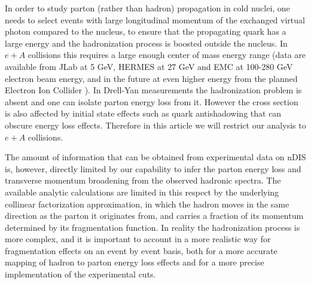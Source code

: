 In order to study parton (rather than hadron) propagation in cold nuclei, one needs to select events with large longitudinal momentum of the exchanged virtual photon compared to the nucleus, to ensure that the propagating quark has a large energy and the hadronization process is boosted outside the nucleus. In $e+A$ collisions this requires a large enough center of mass energy range  (data are available from JLab at 5 GeV, HERMES at 27 GeV and EMC at 100-280 GeV electron beam energy, and in the future at even higher energy from the planned Electron Ion Collider \cite{Accardi:2009qv}). In Drell-Yan measurements the hadronization problem is absent and one can isolate parton energy loss from it. However the cross section is also affected by initial state effects such as quark antishadowing that can obscure energy loss effects. Therefore in this article we will restrict our analysis to $e+A$ collisions.

The amount of information that can be obtained from experimental data on nDIS is, however, directly limited by our capability to infer the parton energy loss and transverse momentum broadening from the observed hadronic spectra. The available analytic calculations \cite{Accardi:2009qv} are limited in this respect by the underlying collinear factorization approximation, in which 
the hadron moves in the same direction as the parton it originates from, and carries a fraction of its momentum determined by its fragmentation function. In reality the hadronization process is more complex, and it is important to account in a more realistic way for fragmentation effects on an event by event basis, both for a more accurate mapping of hadron to parton energy loss effects and for a more precise implementation of the experimental cuts.


